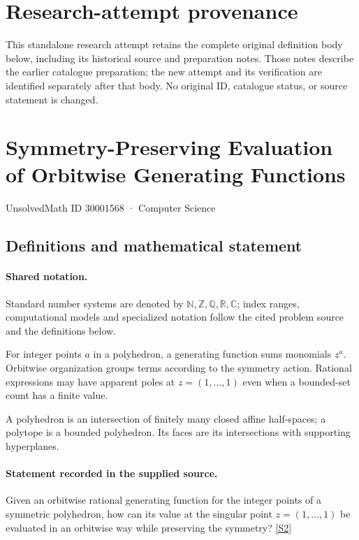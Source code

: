 \documentclass[11pt]{article}
\begin{document}
\section*{Research-attempt provenance}
This standalone research attempt retains the complete original definition body below,
including its historical source and preparation notes. Those notes describe the
earlier catalogue preparation; the new attempt and its verification are identified
separately after that body. No original ID, catalogue status, or source statement is changed.

\section{Symmetry-Preserving Evaluation of Orbitwise Generating Functions}\label{30001568}
{\small UnsolvedMath ID 30001568 · Computer Science}
\subsection{Definitions and mathematical statement}

\paragraph{Shared notation.}Standard number systems are denoted by $\mathbb N,\mathbb Z,\mathbb Q,\mathbb R,\mathbb C$; index ranges, computational models and specialized notation follow the cited problem source and the definitions below.


For integer points $a$ in a polyhedron, a generating function sums monomials $z^a$. Orbitwise organization groups terms according to the symmetry action. Rational expressions may have apparent poles at $z=(1,\ldots,1)$ even when a bounded-set count has a finite value.

A polyhedron is an intersection of finitely many closed affine half-spaces; a polytope is a bounded polyhedron. Its faces are its intersections with supporting hyperplanes.
\paragraph{Statement recorded in the supplied source.}
Given an orbitwise rational generating function for the integer points of a symmetric polyhedron, how can its value at the singular point $z=(1,\ldots,1)$ be evaluated in an orbitwise way while preserving the symmetry? \href{https://doi.org/10.4171/owr/2010/38}{[S2]}
\end{document}
